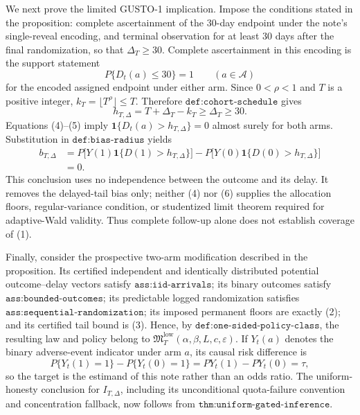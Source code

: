 We next prove the limited GUSTO-1 implication.  Impose the conditions stated in the proposition: complete ascertainment of the \(30\)-day endpoint under the note's single-reveal encoding, and terminal observation for at least \(30\) days after the final randomization, so that \(\Delta_T\geq30\).  Complete ascertainment in this encoding is the support statement
\[
 P\{D_t(a)\leq30\}=1
 \qquad(a\in\mathcal A)
\tag{4}
\]
for the encoded assigned endpoint under either arm.  Since \(0<\rho<1\) and \(T\) is a positive integer, \(k_T=\lfloor T^\rho\rfloor\leq T\).  Therefore \(\texttt{def:cohort-schedule}\) gives
\[
 h_{T,\Delta}=T+\Delta_T-k_T\geq\Delta_T\geq30.
\tag{5}
\]
Equations (4)--(5) imply \(\mathbf 1\{D_t(a)>h_{T,\Delta}\}=0\) almost surely for both arms.  Substitution in \(\texttt{def:bias-radius}\) yields
\[
 \begin{aligned}
 b_{T,\Delta}
 &=P\bigl[Y(1)\mathbf 1\{D(1)>h_{T,\Delta}\}\bigr]
   -P\bigl[Y(0)\mathbf 1\{D(0)>h_{T,\Delta}\}\bigr]\\
 &=0.
 \end{aligned}
\tag{6}
\]
This conclusion uses no independence between the outcome and its delay.  It removes the delayed-tail bias only; neither (4) nor (6) supplies the allocation floors, regular-variance condition, or studentized limit theorem required for adaptive-Wald validity.  Thus complete follow-up alone does not establish coverage of (1).

Finally, consider the prospective two-arm modification described in the proposition.  Its certified independent and identically distributed potential outcome--delay vectors satisfy \(\texttt{ass:iid-arrivals}\); its binary outcomes satisfy \(\texttt{ass:bounded-outcomes}\); its predictable logged randomization satisfies \(\texttt{ass:sequential-randomization}\); its imposed permanent floors are exactly (2); and its certified tail bound is (3).  Hence, by \(\texttt{def:one-sided-policy-class}\), the resulting law and policy belong to
\(\mathfrak M_T^{\mathrm{low}}(\alpha,\beta,L,c,\varepsilon)\).  If \(Y_t(a)\) denotes the binary adverse-event indicator under arm \(a\), its causal risk difference is
\[
 P\{Y_t(1)=1\}-P\{Y_t(0)=1\}
 =P Y_t(1)-P Y_t(0)=\tau,
\tag{7}
\]
so the target is the estimand of this note rather than an odds ratio.  The uniform-honesty conclusion for \(I_{T,\Delta}\), including its unconditional quota-failure convention and concentration fallback, now follows from \(\texttt{thm:uniform-gated-inference}\).

